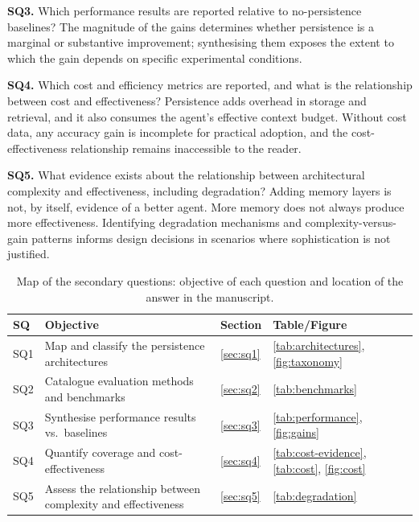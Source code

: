 \noindent\textbf{SQ3.} Which performance results are reported relative
to no-persistence baselines?
The magnitude of the gains determines whether persistence is a marginal
or substantive improvement; synthesising them exposes the extent to
which the gain depends on specific experimental conditions.

\noindent\textbf{SQ4.} Which cost and efficiency metrics are reported,
and what is the relationship between cost and effectiveness?
Persistence adds overhead in storage and retrieval, and it also
consumes the agent's effective context budget.
Without cost data, any accuracy gain is incomplete for practical
adoption, and the cost-effectiveness relationship remains inaccessible
to the reader.

\noindent\textbf{SQ5.} What evidence exists about the relationship
between architectural complexity and effectiveness, including
degradation?
Adding memory layers is not, by itself, evidence of a better agent.
More memory does not always produce more effectiveness.
Identifying degradation mechanisms and complexity-versus-gain patterns
informs design decisions in scenarios where sophistication is not
justified.

\begin{table}[htbp]
\centering
\caption{Map of the secondary questions: objective of each question and
location of the answer in the manuscript.}
\label{tab:rq-map}
\small
\begin{tabularx}{\textwidth}{l X l l}
\toprule
\textbf{SQ} & \textbf{Objective} & \textbf{Section} & \textbf{Table/Figure} \\
\midrule
SQ1 & Map and classify the persistence architectures &
  \autoref{sec:sq1} & \autoref{tab:architectures}, \autoref{fig:taxonomy} \\
SQ2 & Catalogue evaluation methods and benchmarks &
  \autoref{sec:sq2} & \autoref{tab:benchmarks} \\
SQ3 & Synthesise performance results vs.\ baselines &
  \autoref{sec:sq3} & \autoref{tab:performance}, \autoref{fig:gains} \\
SQ4 & Quantify coverage and cost-effectiveness &
  \autoref{sec:sq4} & \autoref{tab:cost-evidence}, \autoref{tab:cost},
  \autoref{fig:cost} \\
SQ5 & Assess the relationship between complexity and effectiveness &
  \autoref{sec:sq5} & \autoref{tab:degradation} \\
\bottomrule
\end{tabularx}
\end{table}

